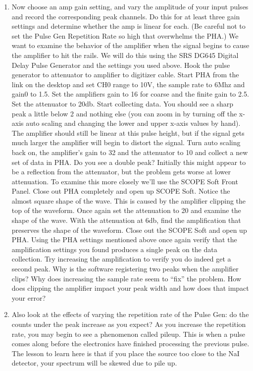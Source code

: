 \documentclass{../lab}
\begin{document}
\begin{enumerate}
    \item Now choose an amp gain setting, and vary the amplitude of your input pulses and record the corresponding peak channels. Do this for at least three gain settings and determine whether the amp is linear for each. (Be careful not to set the Pulse Gen Repetition Rate so high that overwhelms the PHA.) We want to examine the behavior of the amplifier when the signal begins to cause the amplifier to hit the rails. We will do this using the SRS DG645 Digital Delay Pulse Generator and the settings you used above. Hook the pulse generator to attenuator to amplifier to digitizer cable. Start PHA from the link on the desktop and set CH0 range to 10V, the sample rate to 6Mhz and gain0 to 1.5. Set the amplifiers gain to 16 for coarse and the finite gain to 2.5. Set the attenuator to 20db. Start collecting data. You should see a sharp peak a little below 2 and nothing else (you can zoom in by turning off the x-axis auto scaling and changing the lower and upper x-axis values by hand). The amplifier should still be linear at this pulse height, but if the signal gets much larger the amplifier will begin to distort the signal. Turn auto scaling back on, the amplifier's gain to 32 and the attenuator to 10 and collect a new set of data in PHA. Do you see a double peak? Initially this might appear to be a reflection from the attenuator, but the problem gets worse at lower attenuation. To examine this more closely we'll use the SCOPE Soft Front Panel. Close out PHA completely and open up SCOPE Soft. Notice the almost square shape of the wave. This is caused by the amplifier clipping the top of the waveform. Once again set the attenuation to 20 and examine the shape of the wave. With the attenuation at 6db, find the amplification that preserves the shape of the waveform. Close out the SCOPE Soft and open up PHA. Using the PHA settings mentioned above once again verify that the amplification settings you found produces a single peak on the data collection. Try increasing the amplification to verify you do indeed get a second peak. Why is the software registering two peaks when the amplifier clips? Why does increasing the sample rate seem to ``fix'' the problem. How does clipping the amplifier impact your peak width and how does that impact your error?

    \item Also look at the effects of varying the repetition rate of the Pulse Gen: do the counts under the peak increase as you expect? As you increase the repetition rate, you may begin to see a phenomenon called pileup. This is when a pulse comes along before the electronics have finished processing the previous pulse. The lesson to learn here is that if you place the source too close to the NaI detector, your spectrum will be skewed due to pile up.
    

\end{enumerate}
\end{document}
